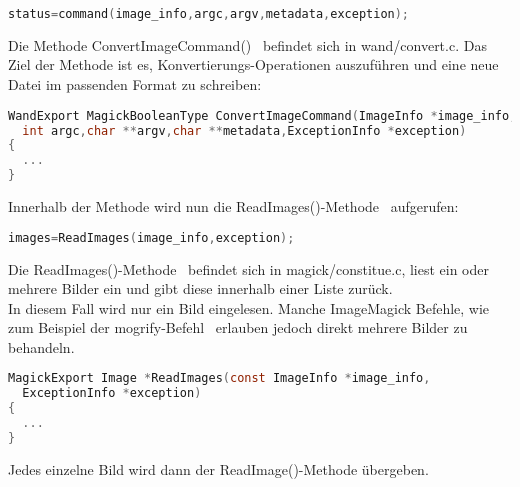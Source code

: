 \begin{lstlisting}[firstnumber=172, language=C, caption=wand/migrify.c Aufruf des ConvertImageCommand,label={lst:lstlisting}]
status=command(image_info,argc,argv,metadata,exception);
\end{lstlisting}
\vspace{5mm}


Die Methode ConvertImageCommand()~\cite{DeklarationConvertIMageCommand} befindet sich in wand/convert.c. Das Ziel der Methode ist es, Konvertierungs-Operationen auszuführen und eine neue Datei im passenden Format zu schreiben:\\

\begin{lstlisting}[firstnumber=498, language=C, caption=wand/convert.c ConvertImageCommand(),label={lst:lstlisting}]
WandExport MagickBooleanType ConvertImageCommand(ImageInfo *image_info,
  int argc,char **argv,char **metadata,ExceptionInfo *exception)
{
  ...
}
\end{lstlisting}
\vspace{5mm}

Innerhalb der Methode wird nun die ReadImages()-Methode~\cite{AufrufReadImages} aufgerufen:

\begin{lstlisting}[firstnumber=628, language=C, caption=wand/convert.c Aufruf ReadImages(),label={lst:lstlisting}]
  images=ReadImages(image_info,exception);
\end{lstlisting}
\vspace{5mm}

Die ReadImages()-Methode~\cite{DeklarationReadImages} befindet sich in magick/constitue.c, liest ein oder mehrere Bilder ein und gibt diese innerhalb einer Liste zurück.\\
In diesem Fall wird nur ein Bild eingelesen.
Manche ImageMagick Befehle, wie zum Beispiel der mogrify-Befehl~\cite{MogrifyCommand} erlauben jedoch direkt mehrere Bilder zu behandeln.\\

\begin{lstlisting}[firstnumber=790, language=C, caption=magick/constitute.c ReadImages(),label={lst:lstlisting}]
MagickExport Image *ReadImages(const ImageInfo *image_info,
  ExceptionInfo *exception)
{
  ...
}
\end{lstlisting}
\vspace{5mm}

Jedes einzelne Bild wird dann der ReadImage()-Methode übergeben.\\

